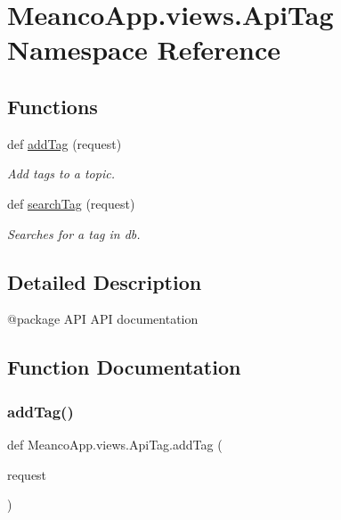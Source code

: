 \hypertarget{namespace_meanco_app_1_1views_1_1_api_tag}{}\section{Meanco\+App.\+views.\+Api\+Tag Namespace Reference}
\label{namespace_meanco_app_1_1views_1_1_api_tag}
\subsection*{Functions}
\begin{DoxyCompactItemize}
\item 
def \hyperlink{namespace_meanco_app_1_1views_1_1_api_tag_a354827642b05d0690d3baac004328b6b}{add\+Tag} (request)
\begin{DoxyCompactList}\small\item\em Add tags to a topic. \end{DoxyCompactList}\item 
def \hyperlink{namespace_meanco_app_1_1views_1_1_api_tag_acd69ccc1145d97e4decbaab3092df35d}{search\+Tag} (request)
\begin{DoxyCompactList}\small\item\em Searches for a tag in db. \end{DoxyCompactList}\end{DoxyCompactItemize}


\subsection{Detailed Description}
\begin{DoxyVerb}@package API
API documentation\end{DoxyVerb}
 

\subsection{Function Documentation}
\hypertarget{namespace_meanco_app_1_1views_1_1_api_tag_a354827642b05d0690d3baac004328b6b}{}\label{namespace_meanco_app_1_1views_1_1_api_tag_a354827642b05d0690d3baac004328b6b} 
\subsubsection{\texorpdfstring{add\+Tag()}{addTag()}}
{\footnotesize\ttfamily def Meanco\+App.\+views.\+Api\+Tag.\+add\+Tag (\begin{DoxyParamCaption}\item[{}]{request }\end{DoxyParamCaption})}




